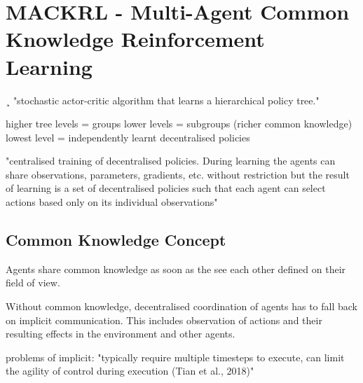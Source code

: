 \section{MACKRL - Multi-Agent Common Knowledge Reinforcement Learning}
¸
"stochastic actor-critic algorithm that learns a hierarchical policy tree."

higher tree levels = groups
lower levels = subgroups (richer common knowledge)
lowest level = independently learnt decentralised policies


"centralised training of decentralised policies.
During learning the agents can share observations, parameters, gradients, etc. without restriction but
the result of learning is a set of decentralised policies such that each agent can select actions based
only on its individual observations"

\subsection{Common Knowledge Concept}
Agents share common knowledge as soon as the see each other defined on their field of view.

Without common knowledge, decentralised coordination of agents has to fall back on implicit communication. This includes observation of actions and their resulting effects in the environment and other agents.

problems of implicit:
"typically
require multiple timesteps to execute, can limit the agility of control during execution (Tian et al.,
2018)"